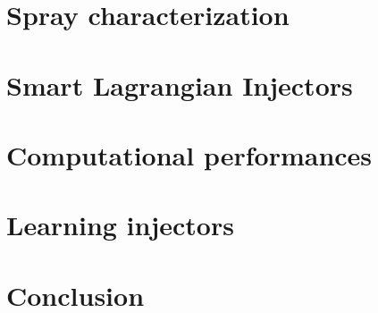 \clearpage


\section{Spray characterization}

\section{Smart Lagrangian Injectors}
\label{sec:ch8_learning_SLI_in_BIMER}



\section{Computational performances}


\section{Learning injectors}




\section{Conclusion}
